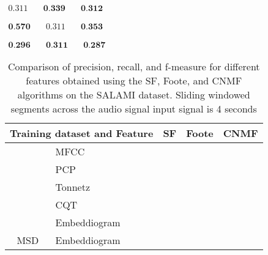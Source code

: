 \newsavebox\cqtSF
\begin{lrbox}{\cqtSF}
   $\begin{aligned}
     0.311 & \quad \textbf{0.339} & \quad \textbf{0.312}
    \end{aligned} $
\end{lrbox}

\newsavebox\cqtFoote
\begin{lrbox}{\cqtFoote}
   $\begin{aligned}
     \textbf{0.570} & \quad 0.311 & \quad \textbf{0.353}
    \end{aligned} $
\end{lrbox}

\newsavebox\cqtCNMF
\begin{lrbox}{\cqtCNMF}
   $\begin{aligned}
     \textbf{0.296} & \quad \textbf{0.311} & \quad \textbf{0.287}
    \end{aligned} $
\end{lrbox}


\begin{table}
  \centering
  \begin{adjustbox}{width=\textwidth}
  \begin{threeparttable}
    \begin{tabular}{c|l|c|c|c} 
\toprule
     \multicolumn{2}{c|}{\textbf{Training dataset} and \textbf{Feature}}  & \multicolumn{1}{c}{\textbf{SF}} & \multicolumn{1}{c}{\textbf{Foote}} & \multicolumn{1}{c}{\textbf{CNMF}} 
     \\ \midrule 
    \multirow{5}{*}{}&   
         \multirow{1}{*}{MFCC } & \usebox{\mfccSF} & \usebox{\mfccFoote} & \usebox{\mfccCNMF} \\\cline{2-5}
        & \multirow{1}{*}{PCP} & \usebox{\pcpSF} & \usebox{\pcpFoote} & \usebox{\pcpCNMF} \\\cline{2-5}
        & \multirow{1}{*}{Tonnetz} & \usebox{\tonnetzSF} & \usebox{\tonnetzFoote} & \usebox{\tonnetzCNMF} \\\cline{2-5} 
        & \multirow{1}{*}{CQT} & \usebox{\cqtSF} & \usebox{\cqtFoote} & \usebox{\cqtCNMF} \\\cline{1-5} 
    \multirow{1}{*}{GTZAN}& 
        \multirow{1}{*}{Embeddiogram} & \usebox{\embeddioaSF} & \usebox{\embeddioaFoote} & \usebox{\embeddioaCNMF} \\\cline{1-5} 
    \multirow{1}{*}{MSD}& 
        \multirow{1}{*}{Embeddiogram} & \usebox{\embeddiobSF} & \usebox{\embeddiobFoote} & \usebox{\embeddiobCNMF} \\\bottomrule
    \end{tabular}
    \caption[Metric comparison for different audio features]{Comparison of precision, recall, and f-measure for different features obtained using the SF, Foote, and CNMF algorithms \cite{sf} \cite{foote} \cite{cnmf} on the SALAMI dataset. Sliding windowed segments across the audio signal input signal is 4 seconds}\label{ta:results}
  \end{threeparttable}
  \end{adjustbox}
\end{table}



